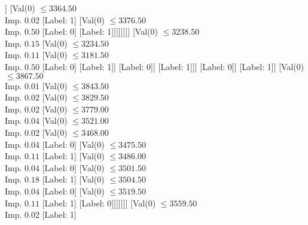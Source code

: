\documentclass[margin=10pt]{standalone}
\begin{document}
\begin{forest}
							[Val($0$) $ \leq 3194.00$ \\ Imp. $0.04$
								[Label: 1]
								[Val($0$) $ \leq 3212.50$ \\ Imp. $0.08$
									[Label: 0]
									[Val($0$) $ \leq 3239.50$ \\ Imp. $0.05$
										[Label: 1]
										[Val($0$) $ \leq 3244.50$ \\ Imp. $0.05$
											[Label: 0]
											[Val($0$) $ \leq 3291.50$ \\ Imp. $0.02$
												[Val($0$) $ \leq 3273.50$ \\ Imp. $0.17$
													[Label: 1]
													[Label: 0]]
												[Val($0$) $ \leq 3364.50$ \\ Imp. $0.02$
													[Label: 1]
													[Val($0$) $ \leq 3376.50$ \\ Imp. $0.50$
														[Label: 0]
														[Label: 1]]]]]]]]
							[Val($0$) $ \leq 3238.50$ \\ Imp. $0.15$
								[Val($0$) $ \leq 3234.50$ \\ Imp. $0.11$
									[Val($0$) $ \leq 3181.50$ \\ Imp. $0.50$
										[Label: 0]
										[Label: 1]]
									[Label: 0]]
								[Label: 1]]]
						[Label: 0]]
					[Label: 1]]
				[Val($0$) $ \leq 3867.50$ \\ Imp. $0.01$
					[Val($0$) $ \leq 3843.50$ \\ Imp. $0.02$
						[Val($0$) $ \leq 3829.50$ \\ Imp. $0.02$
							[Val($0$) $ \leq 3779.00$ \\ Imp. $0.04$
								[Val($0$) $ \leq 3521.00$ \\ Imp. $0.02$
									[Val($0$) $ \leq 3468.00$ \\ Imp. $0.04$
										[Label: 0]
										[Val($0$) $ \leq 3475.50$ \\ Imp. $0.11$
											[Label: 1]
											[Val($0$) $ \leq 3486.00$ \\ Imp. $0.04$
												[Label: 0]
												[Val($0$) $ \leq 3501.50$ \\ Imp. $0.18$
													[Label: 1]
													[Val($0$) $ \leq 3504.50$ \\ Imp. $0.04$
														[Label: 0]
														[Val($0$) $ \leq 3519.50$ \\ Imp. $0.11$
															[Label: 1]
															[Label: 0]]]]]]]
									[Val($0$) $ \leq 3559.50$ \\ Imp. $0.02$
										[Label: 1]

\end{forest}
\end{document}
